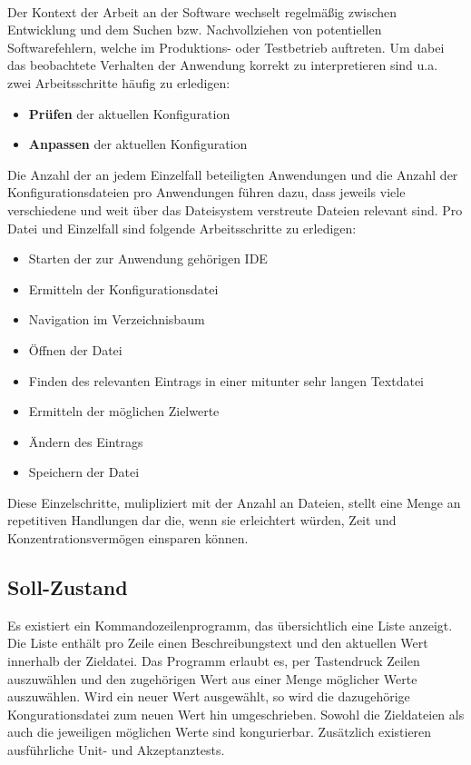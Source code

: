 \paragraph{}
Der Kontext der Arbeit an der Software wechselt regelmäßig zwischen Entwicklung und
dem Suchen bzw. Nachvollziehen von potentiellen Softwarefehlern, welche im Produktions-
oder Testbetrieb auftreten. Um dabei das beobachtete Verhalten der Anwendung korrekt
zu interpretieren sind u.a. zwei Arbeitsschritte häufig zu erledigen:

\begin{itemize}
    \item \textbf{Prüfen} der aktuellen Konfiguration
    \item \textbf{Anpassen} der aktuellen Konfiguration
\end{itemize}

Die Anzahl der an jedem Einzelfall beteiligten Anwendungen und die Anzahl der
Konfigurationsdateien pro Anwendungen führen dazu, dass jeweils viele verschiedene
und weit über das Dateisystem verstreute Dateien relevant sind. Pro Datei und
Einzelfall sind folgende Arbeitsschritte zu erledigen:

\begin{itemize}
    \item Starten der zur Anwendung gehörigen IDE
    \item Ermitteln der Konfigurationsdatei
    \item Navigation im Verzeichnisbaum
    \item Öffnen der Datei
    \item Finden des relevanten Eintrags in einer mitunter sehr langen Textdatei
    \item Ermitteln der möglichen Zielwerte
    \item Ändern des Eintrags
    \item Speichern der Datei
\end{itemize}

Diese Einzelschritte, mulipliziert mit der Anzahl an Dateien, stellt eine
Menge an repetitiven Handlungen dar die, wenn sie erleichtert würden, Zeit und
Konzentrationsvermögen einsparen können.

\subsection{Soll-Zustand}
Es existiert ein Kommandozeilenprogramm, das übersichtlich eine
Liste anzeigt. Die Liste enthält pro Zeile einen Beschreibungstext
und den aktuellen Wert innerhalb der Zieldatei. Das Programm
erlaubt es, per Tastendruck Zeilen auszuwählen und den
zugehörigen Wert aus einer Menge möglicher Werte auszuwählen.
Wird ein neuer Wert ausgewählt, so wird die dazugehörige
Kongurationsdatei zum neuen Wert hin umgeschrieben. Sowohl die Zieldateien als
auch die jeweiligen möglichen Werte sind kongurierbar.
Zusätzlich existieren ausführliche Unit- und Akzeptanztests.